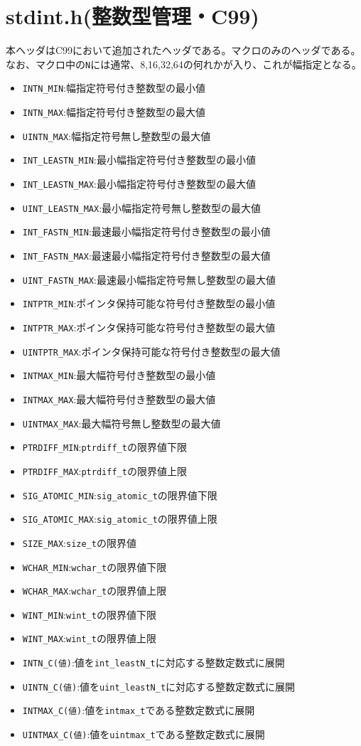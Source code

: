 \section{stdint.h(整数型管理・C99)}
本ヘッダはC99において追加されたヘッダである。マクロのみのヘッダである。なお、マクロ中の\verb|N|には通常、8,16,32,64の何れかが入り、これが幅指定となる。
\begin{itemize}
\item \verb|INTN_MIN|:幅指定符号付き整数型の最小値
\item \verb|INTN_MAX|:幅指定符号付き整数型の最大値
\item \verb|UINTN_MAX|:幅指定符号無し整数型の最大値
\item \verb|INT_LEASTN_MIN|:最小幅指定符号付き整数型の最小値
\item \verb|INT_LEASTN_MAX|:最小幅指定符号付き整数型の最大値
\item \verb|UINT_LEASTN_MAX|:最小幅指定符号無し整数型の最大値
\item \verb|INT_FASTN_MIN|:最速最小幅指定符号付き整数型の最小値
\item \verb|INT_FASTN_MAX|:最速最小幅指定符号付き整数型の最大値
\item \verb|UINT_FASTN_MAX|:最速最小幅指定符号無し整数型の最大値
\item \verb|INTPTR_MIN|:ポインタ保持可能な符号付き整数型の最小値
\item \verb|INTPTR_MAX|:ポインタ保持可能な符号付き整数型の最大値
\item \verb|UINTPTR_MAX|:ポインタ保持可能な符号付き整数型の最大値
\item \verb|INTMAX_MIN|:最大幅符号付き整数型の最小値
\item \verb|INTMAX_MAX|:最大幅符号付き整数型の最大値
\item \verb|UINTMAX_MAX|:最大幅符号無し整数型の最大値
\item \verb|PTRDIFF_MIN|:\verb|ptrdiff_t|の限界値下限
\item \verb|PTRDIFF_MAX|:\verb|ptrdiff_t|の限界値上限
\item \verb|SIG_ATOMIC_MIN|:\verb|sig_atomic_t|の限界値下限
\item \verb|SIG_ATOMIC_MAX|:\verb|sig_atomic_t|の限界値上限
\item \verb|SIZE_MAX|:\verb|size_t|の限界値
\item \verb|WCHAR_MIN|:\verb|wchar_t|の限界値下限
\item \verb|WCHAR_MAX|:\verb|wchar_t|の限界値上限
\item \verb|WINT_MIN|:\verb|wint_t|の限界値下限
\item \verb|WINT_MAX|:\verb|wint_t|の限界値上限
\item \verb|INTN_C(値)|:値を\verb|int_leastN_t|に対応する整数定数式に展開
\item \verb|UINTN_C(値)|:値を\verb|uint_leastN_t|に対応する整数定数式に展開
\item \verb|INTMAX_C(値)|:値を\verb|intmax_t|である整数定数式に展開
\item \verb|UINTMAX_C(値)|:値を\verb|uintmax_t|である整数定数式に展開
\end{itemize}

